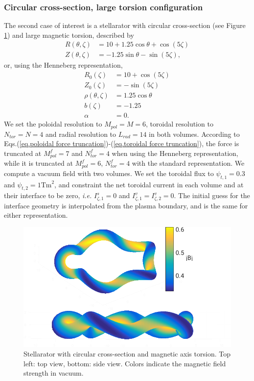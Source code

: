 \documentclass[my_thesis.tex]{subfiles}
\begin{document}
\subsubsection{Circular cross-section, large torsion configuration}
The second case of interest is a stellarator with circular cross-section (see Figure \ref{fig. circular stellarator geometry}) and large magnetic torsion, described by
\begin{align}
	R(\theta,\zeta) &= 10 + 1.25\cos\theta + \cos(5\zeta)\\
	Z(\theta,\zeta) &= -1.25\sin\theta - \sin(5\zeta), 
\end{align}
or, using the Henneberg representation,
\begin{align}
    R_0(\zeta) &= 10 + \cos(5\zeta)\\
	Z_0(\zeta) &= -\sin(5\zeta)\\
	\rho(\theta,\zeta) &= 1.25\cos\theta\\
	b(\zeta) &= -1.25\\
	\alpha &= 0.
\end{align}
We set the poloidal resolution to $M_{pol}=M=6$, toroidal resolution to $N_{tor}=N=4$ and radial resolution to $L_{rad}=14$ in both volumes. According to Eqs.(\ref{eq.poloidal force truncation})-(\ref{eq.toroidal force truncation}), the force is truncated at $M^f_{pol}=7$ and $N^f_{tor}=4$ when using the Henneberg representation, while it is truncated at $M_{pol}^f=6$, $N_{tor}^f=4$ with the standard representation. We compute a vacuum field with two volumes. We set the toroidal flux to $\psi_{t,1}=0.3$ and $\psi_{t,2}=1\text{Tm}^2$, and constraint the net toroidal current in each volume and at their interface to be zero, \textit{i.e.} $I^s_{\zeta,1}=0$ and $I^v_{\zeta,1}=I^v_{\zeta,2}=0$. The initial guess for the interface geometry is interpolated from the plasma boundary, and is the same for either representation.
\begin{figure}
	\centering
	\includegraphics[width=.8\linewidth]{images/HennebergRepresentation/CircularTorsion_modB_boundary.png}
	\caption{Stellarator with circular cross-section and magnetic axis torsion. Top left: top view, bottom: side view. Colors indicate the magnetic field strength in vacuum.}
	\label{fig. circular stellarator geometry}
\end{figure}
\end{document}

